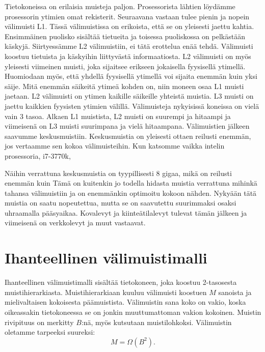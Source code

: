 \documentclass[finnish]{tktltiki2}
\theoremstyle{definition}
\theoremstyle{remark}
\begin{document}
Tietokoneissa on erilaisia muisteja paljon. Prosessorista lähtien löydämme
prosessorin ytimien omat rekisterit. Seuraavana vastaan tulee pienin ja nopein
välimuisti L1. Tässä välimuistissa on erikoista, että se on yleisesti jaettu
kahtia. Ensimmäinen puolisko sisältää tietueita ja toisessa puoliskossa on
pelkästään käskyjä. Siirtyessämme L2 välimuistiin, ei tätä erottelua enää tehdä.
Välimuisti koostuu tietuista ja käskyihin liittyvästä informaatiosta. L2
välimuisti on myös yleisesti viimeinen muisti, joka sijaitsee erikseen
jokaisella fyysisellä ytimellä. Huomiodaan myös, että yhdellä fyysisellä
ytimellä voi sijaita enemmän kuin yksi säije. %
Mitä enemmän säikeitä ytimeä kohden on, niin moneen osaa L1 muisti jaetaan. L2
välimuisti on ytimen kaikille säikeille yhteistä muistia. L3 muisti on jaettu
kaikkien fyysisten ytimien välillä. Välimuisteja nykyisissä koneissa on
vielä vain 3 tasoa. Alkaen L1 muistista, L2 muisti on suurempi ja hitaampi ja
viimeisenä on L3 muisti suurimpana ja vielä hitaampana.
  Välimuistien jälkeen saavumme keskusmuistiin. Keskusmuistia on yleisesti
ottaen reilusti enemmän, jos vertaamme sen kokoa välimuisteihin. Kun katsomme
vaikka intelin prosessoria, i7-3770k,  %

Näihin verrattuna keskusmuistia on tyypillisesti 8 gigaa, mikä on reilusti
enemmän kuin %
Tämä on kuitenkin jo todella hidasta muistia verrattuna mihinkä tahansa
välimuistiin ja on enemmänkin optimoitu kokoon nähden. Nykyään tätä muistia
on saatu nopeutettua, mutta se on saavutettu suurimmaksi osaksi uhraamalla
pääsyaikaa.
Kovalevyt ja kiinteätilalevyt %
tulevat tämän jälkeen ja viimeisenä on verkkolevyt ja muut vastaavat.


\section{Ihanteellinen välimuistimalli}
Ihanteellinen välimuistimalli sisältää
tietokoneen, joka koostuu 2-tasosesta muistihierarkiasta. Muistihierarkiaan
kuuluu välimuisti koostuen $ M $ sanoista ja mielivaltaisen
kokoisesta päämuistista. Välimuistin sana koko on
vakio, koska oikeassakin tietokoneessa se on jonkin muuttumattoman vakion kokoinen.
Muistin rivipituus on merkitty $B$:nä, myös kutsutaan muistilohkoksi.
Välimuistin oletamme tarpeeksi suureksi:
\[
M=\Omega(B^2).
\]
\end{document}
